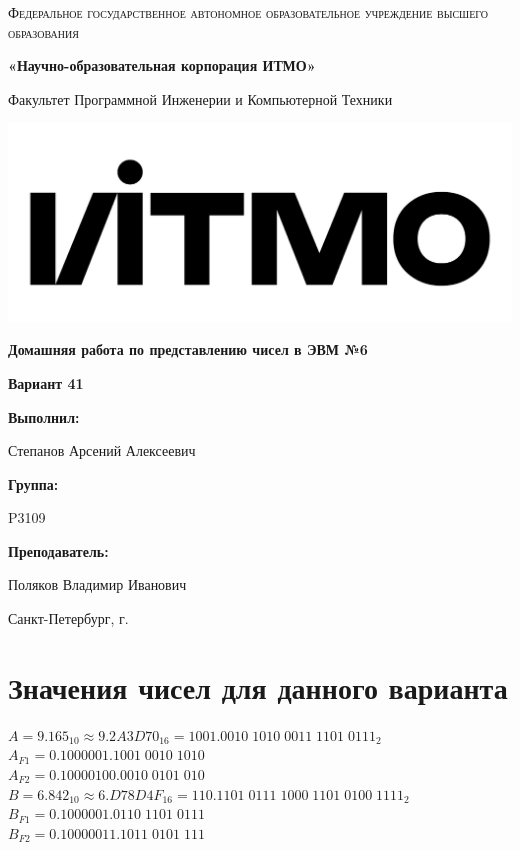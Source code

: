 \documentclass[12pt,a4paper]{report}
\begin{document}
\begin{titlepage}
	\centering
	{
        \scshape
        Федеральное государственное автономное образовательное учреждение высшего образования
        \par
        \textbf{«Научно-образовательная корпорация ИТМО»}
        \par
        \vspace*{1cm}
        Факультет Программной Инженерии и Компьютерной Техники
        \par
    }
    \vspace*{0.6cm}
    \includegraphics[width=\textwidth]{logo.png}
    {
        \Large
        \textbf{Домашняя работа по представлению чисел в ЭВМ №6}
        \par
        \normalsize
        \vspace*{0.75cm}
        \textbf{Вариант 41}
        \par
    }
    \vfill
    \hfill\begin{minipage}{\dimexpr\textwidth-7.8cm}
        \textbf{Выполнил:}\par
        Степанов Арсений Алексеевич\par
        \vspace*{0.15cm}
        \textbf{Группа:}\par
        P3109\par
        \vspace*{0.15cm}
        \textbf{Преподаватель:}\par
        Поляков Владимир Иванович\par
    \end{minipage}
    \vfill
    Санкт-Петербург, \the\year{}г.
\end{titlepage}
\large
\section*{Значения чисел для данного варианта}
\onehalfspacing
$A=9.165_{10}\approx9.2A3D70_{16}=1001.0010\;1010\;0011\;1101\;0111_2$\\
$A_{F1}=0.1000001.1001\;0010\;1010$\\
$A_{F2}=0.10000100.0010\;0101\;010$\\
\hfill\break
$B=6.842_{10}\approx6.D78D4F_{16}=110.1101\;0111\;1000\;1101\;0100\;1111_2$\\
$B_{F1}=0.1000001.0110\;1101\;0111$\\
$B_{F2}=0.10000011.1011\;0101\;111$
\end{document}
